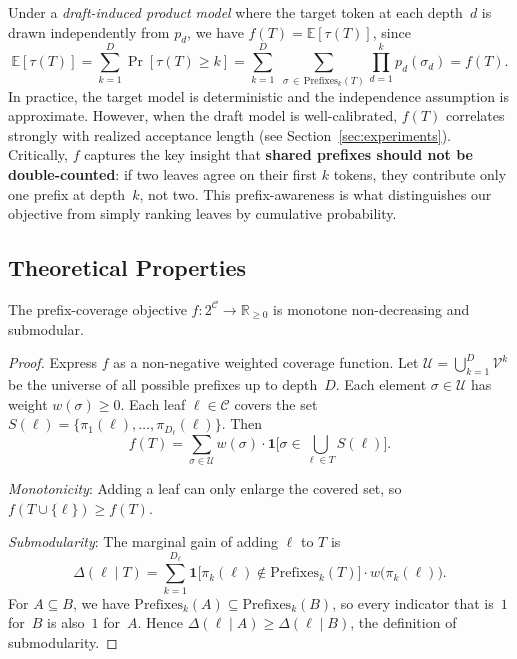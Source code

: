 \begin{remark}
\label{rem:interpretation}
Under a \emph{draft-induced product model} where the target token at
each depth~$d$ is drawn independently from $p_d$, we have
$f(T) = \mathbb{E}[\tau(T)]$, since
\[
  \mathbb{E}[\tau(T)]
  = \sum_{k=1}^{D} \Pr[\tau(T) \geq k]
  = \sum_{k=1}^{D}\;\sum_{\sigma \,\in\, \mathrm{Prefixes}_k(T)}
    \prod_{d=1}^{k} p_d(\sigma_d)
  = f(T).
\]
In practice, the target model is deterministic and the independence
assumption is approximate.  However, when the draft model is
well-calibrated, $f(T)$ correlates strongly with realized acceptance
length (see Section~\ref{sec:experiments}).  Critically, $f$ captures
the key insight that \textbf{shared prefixes should not be
double-counted}: if two leaves agree on their first $k$ tokens, they
contribute only one prefix at depth~$k$, not two.  This
prefix-awareness is what distinguishes our objective from simply ranking
leaves by cumulative probability.
\end{remark}

\subsection{Theoretical Properties}
\label{sec:theory}

\begin{proposition}
\label{prop:submodular}
The prefix-coverage objective $f \colon 2^{\mathcal{C}} \to
\mathbb{R}_{\geq 0}$ is monotone non-decreasing and submodular.
\end{proposition}

\begin{proof}
Express $f$ as a non-negative weighted coverage function.  Let
$\mathcal{U} = \bigcup_{k=1}^{D} \mathcal{V}^k$ be the universe of all
possible prefixes up to depth~$D$.  Each element $\sigma \in
\mathcal{U}$ has weight $w(\sigma) \geq 0$.  Each leaf $\ell \in
\mathcal{C}$ covers the set $S(\ell) = \{\pi_1(\ell), \dots,
\pi_{D_\ell}(\ell)\}$.  Then
\[
  f(T) = \sum_{\sigma \in \mathcal{U}} w(\sigma)
    \cdot \mathbf{1}\!\bigl[\sigma \in \textstyle\bigcup_{\ell \in T}
    S(\ell)\bigr].
\]

\emph{Monotonicity}: Adding a leaf can only enlarge the covered set, so
$f(T \cup \{\ell\}) \geq f(T)$.

\emph{Submodularity}: The marginal gain of adding $\ell$ to $T$ is
\[
  \Delta(\ell \mid T)
  = \sum_{k=1}^{D_\ell}
    \mathbf{1}\!\bigl[\pi_k(\ell) \notin \mathrm{Prefixes}_k(T)\bigr]
    \cdot w\!\bigl(\pi_k(\ell)\bigr).
\]
For $A \subseteq B$, we have $\mathrm{Prefixes}_k(A) \subseteq
\mathrm{Prefixes}_k(B)$, so every indicator that is~$1$ for~$B$ is
also~$1$ for~$A$.  Hence $\Delta(\ell \mid A) \geq \Delta(\ell \mid
B)$, the definition of submodularity.
\end{proof}

